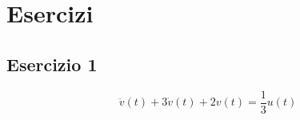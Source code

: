 \documentclass[a4paper]{report}
\begin{document}
	\section{Esercizi}
	
	\subsection{Esercizio 1}
	\begin{equation}
		\ddot{v}(t) + 3\dot{v}(t)+2v(t) = \frac{1}{3}u(t)
	\end{equation}
	
\end{document}
